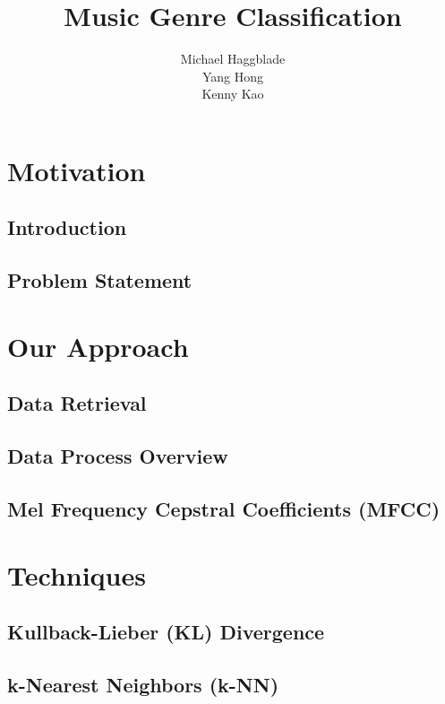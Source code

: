 \documentclass{article} %
\title{Music Genre Classification}
\author{
Michael Haggblade \\
\And
Yang Hong \\
\And
Kenny Kao
}
\begin{document}
\maketitle


\section{Motivation}

\subsection{Introduction}


\subsection{Problem Statement}



\section{Our Approach}

\subsection{Data Retrieval}

\subsection{Data Process Overview}

\subsection{Mel Frequency Cepstral Coefficients (MFCC)}


\section{Techniques}

\subsection{Kullback-Lieber (KL) Divergence}

\subsection{k-Nearest Neighbors (k-NN)}
\end{document}
